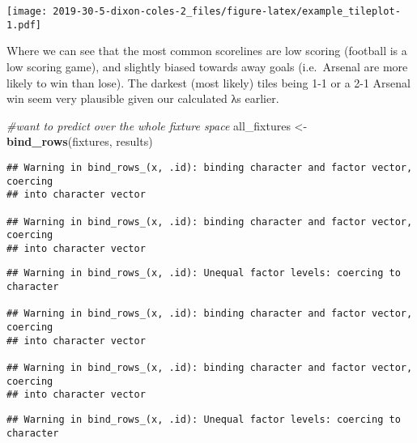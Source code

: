 \documentclass[
]{article}
\newenvironment{Shaded}{\begin{snugshade}}{\end{snugshade}}
\newcommand{\CommentTok}[1]{\textcolor[rgb]{0.56,0.35,0.01}{\textit{#1}}}
\newcommand{\KeywordTok}[1]{\textcolor[rgb]{0.13,0.29,0.53}{\textbf{#1}}}
\newcommand{\NormalTok}[1]{#1}
\newcommand{\OperatorTok}[1]{\textcolor[rgb]{0.81,0.36,0.00}{\textbf{#1}}}
\newcommand{\StringTok}[1]{\textcolor[rgb]{0.31,0.60,0.02}{#1}}
\begin{document}
\texttt{[image: 2019-30-5-dixon-coles-2\_files/figure-latex/example\_tileplot-1.pdf]}

Where we can see that the most common scorelines are low scoring
(football is a low scoring game), and slightly biased towards away goals
(i.e.~Arsenal are more likely to win than lose). The darkest (most
likely) tiles being 1-1 or a 2-1 Arsenal win seem very plausible given
our calculated λs earlier.

\begin{Shaded}
\begin{Highlighting}[]
\CommentTok{#want to predict over the whole fixture space}
\NormalTok{all_fixtures <-}\StringTok{ }\KeywordTok{bind_rows}\NormalTok{(fixtures, results)}
\end{Highlighting}
\end{Shaded}

\begin{verbatim}
## Warning in bind_rows_(x, .id): binding character and factor vector, coercing
## into character vector

## Warning in bind_rows_(x, .id): binding character and factor vector, coercing
## into character vector
\end{verbatim}

\begin{Shaded}
\end{Shaded}

\begin{verbatim}
## Warning in bind_rows_(x, .id): Unequal factor levels: coercing to character

## Warning in bind_rows_(x, .id): binding character and factor vector, coercing
## into character vector

## Warning in bind_rows_(x, .id): binding character and factor vector, coercing
## into character vector
\end{verbatim}

\begin{verbatim}
## Warning in bind_rows_(x, .id): Unequal factor levels: coercing to character
\end{verbatim}
\end{document}
